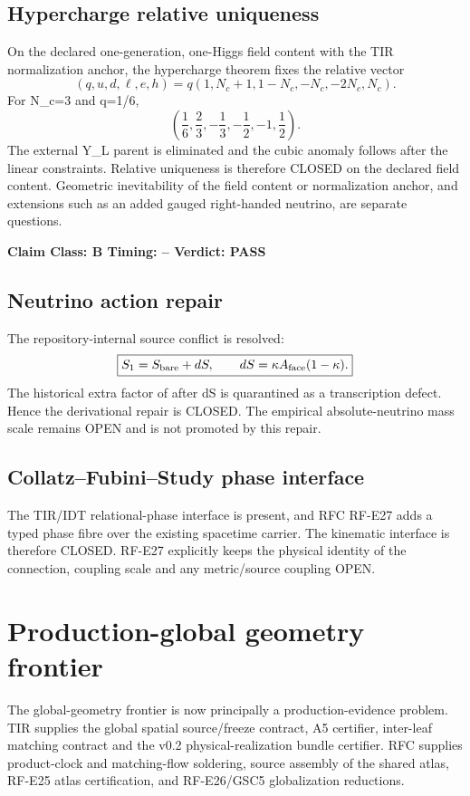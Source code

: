 \documentclass[11pt,a4paper,twoside]{book}
\def\({}%
\def\){}%
\theoremstyle{definition}
\newcommand{\vTwelveStatus}[3]{\par\noindent\textbf{Claim Class: #1 \quad Timing: #2 \quad Verdict: #3}\par}
\begin{document}
\subsection{Hypercharge relative uniqueness}

On the declared one-generation, one-Higgs field content with the TIR
normalization anchor, the hypercharge theorem fixes the relative vector
\[
(q,u,d,\ell,e,h)
=q(1,N_c+1,1-N_c,-N_c,-2N_c,N_c).
\]
For \(N_c=3\) and \(q=1/6\),
\[
\boxed{
\left(\frac16,\frac23,-\frac13,-\frac12,-1,\frac12\right).
}
\]
The external \(Y_L\) parent is eliminated and the cubic anomaly follows after
the linear constraints. Relative uniqueness is therefore CLOSED on the declared
field content. Geometric inevitability of the field content or normalization
anchor, and extensions such as an added gauged right-handed neutrino, are
separate questions.
\vTwelveStatus{B}{--}{PASS}

\subsection{Neutrino action repair}

The repository-internal source conflict is resolved:
\[
\boxed{
S_1=S_{\rm bare}+dS,
\qquad
dS=\kappa A_{\rm face}(1-\kappa).
}
\]
The historical extra factor of \(\kappa\) after \(dS\) is quarantined as a
transcription defect. Hence the derivational repair is CLOSED. The empirical
absolute-neutrino mass scale remains OPEN and is not promoted by this repair.

\subsection{Collatz--Fubini--Study phase interface}

The TIR/IDT relational-phase interface is present, and RFC RF-E27 adds a typed
phase fibre over the existing spacetime carrier. The kinematic interface is
therefore CLOSED. RF-E27 explicitly keeps the physical identity of the
connection, coupling scale and any metric/source coupling OPEN.

\section{Production-global geometry frontier}

The global-geometry frontier is now principally a production-evidence problem.
TIR supplies the global spatial source/freeze contract, A5 certifier,
inter-leaf matching contract and the v0.2 physical-realization bundle
certifier. RFC supplies product-clock and matching-flow soldering, source
assembly of the shared atlas, RF-E25 atlas certification, and RF-E26/GSC5
globalization reductions.
\end{document}
